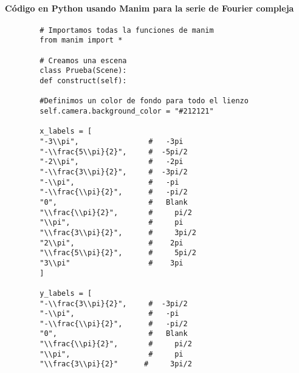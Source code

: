 \paragraph{Código en Python usando Manim para la serie de Fourier compleja} \label{app3:complex-code-python-manim}
\begin{longlisting}
	\begin{verbatim}
		# Importamos todas la funciones de manim
		from manim import *
		
		# Creamos una escena
		class Prueba(Scene):
		def construct(self):
		
		#Definimos un color de fondo para todo el lienzo
		self.camera.background_color = "#212121" 
		
		x_labels = [
		"-3\\pi",                #   -3pi
		"-\\frac{5\\pi}{2}",     #  -5pi/2
		"-2\\pi",                #   -2pi
		"-\\frac{3\\pi}{2}",     #  -3pi/2
		"-\\pi",                 #   -pi
		"-\\frac{\\pi}{2}",      #   -pi/2
		"0",                     #   Blank
		"\\frac{\\pi}{2}",       #     pi/2
		"\\pi",                  #     pi
		"\\frac{3\\pi}{2}",      #     3pi/2
		"2\\pi",                 #    2pi
		"\\frac{5\\pi}{2}",      #     5pi/2
		"3\\pi"                  #    3pi
		]
		
		y_labels = [
		"-\\frac{3\\pi}{2}",     #  -3pi/2
		"-\\pi",                 #   -pi
		"-\\frac{\\pi}{2}",      #   -pi/2
		"0",                     #   Blank
		"\\frac{\\pi}{2}",       #     pi/2
		"\\pi",                  #     pi
		"\\frac{3\\pi}{2}"      #     3pi/2
		

\end{verbatim}
\end{longlisting}
